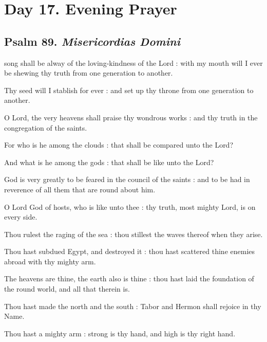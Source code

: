\section*{Day 17. Evening Prayer}

\subsection{Psalm 89. \textit{Misericordias Domini}}

 song shall be alway of the loving-kindness of the Lord : with my mouth will I ever be shewing thy truth from one generation to another.\par
{}
Thy seed will I stablish for ever : and set up thy throne from one generation to another.\par
{}O Lord, the very heavens shall praise thy wondrous works : and thy truth in the congregation of the saints.\par
{}For who is he among the clouds : that shall be compared unto the Lord?\par
{}And what is he among the gods : that shall be like unto the Lord?\par
{}God is very greatly to be feared in the council of the saints : and to be had in reverence of all them that are round about him.\par
{}O Lord God of hosts, who is like unto thee : thy truth, most mighty Lord, is on every side.\par
{}Thou rulest the raging of the sea : thou stillest the waves thereof when they arise.\par
{}Thou hast subdued Egypt, and destroyed it : thou hast scattered thine enemies abroad with thy mighty arm.\par
{}The heavens are thine, the earth also is thine : thou hast laid the foundation of the round world, and all that therein is.\par
{}Thou hast made the north and the south : Tabor and Hermon shall rejoice in thy Name.\par
{}Thou hast a mighty arm : strong is thy hand, and high is thy right hand.\par
